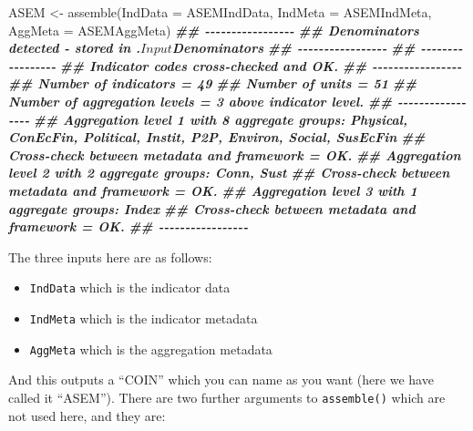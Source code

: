 \documentclass[
]{book}
\newenvironment{Shaded}{\begin{snugshade}}{\end{snugshade}}
\newcommand{\AttributeTok}[1]{\textcolor[rgb]{0.77,0.63,0.00}{#1}}
\newcommand{\DocumentationTok}[1]{\textcolor[rgb]{0.56,0.35,0.01}{\textbf{\textit{#1}}}}
\newcommand{\FunctionTok}[1]{\textcolor[rgb]{0.00,0.00,0.00}{#1}}
\newcommand{\NormalTok}[1]{#1}
\newcommand{\OtherTok}[1]{\textcolor[rgb]{0.56,0.35,0.01}{#1}}
\providecommand{\tightlist}{%
  \setlength{\itemsep}{0pt}\setlength{\parskip}{0pt}}
\begin{document}
\begin{Shaded}
\begin{Highlighting}[]
\NormalTok{ASEM }\OtherTok{\textless{}{-}} \FunctionTok{assemble}\NormalTok{(}\AttributeTok{IndData =}\NormalTok{ ASEMIndData, }\AttributeTok{IndMeta =}\NormalTok{ ASEMIndMeta, }\AttributeTok{AggMeta =}\NormalTok{ ASEMAggMeta)}
\DocumentationTok{\#\# {-}{-}{-}{-}{-}{-}{-}{-}{-}{-}{-}{-}{-}{-}{-}{-}{-}}
\DocumentationTok{\#\# Denominators detected {-} stored in .$Input$Denominators}
\DocumentationTok{\#\# {-}{-}{-}{-}{-}{-}{-}{-}{-}{-}{-}{-}{-}{-}{-}{-}{-}}
\DocumentationTok{\#\# {-}{-}{-}{-}{-}{-}{-}{-}{-}{-}{-}{-}{-}{-}{-}{-}{-}}
\DocumentationTok{\#\# Indicator codes cross{-}checked and OK.}
\DocumentationTok{\#\# {-}{-}{-}{-}{-}{-}{-}{-}{-}{-}{-}{-}{-}{-}{-}{-}{-}}
\DocumentationTok{\#\# Number of indicators = 49}
\DocumentationTok{\#\# Number of units = 51}
\DocumentationTok{\#\# Number of aggregation levels = 3 above indicator level.}
\DocumentationTok{\#\# {-}{-}{-}{-}{-}{-}{-}{-}{-}{-}{-}{-}{-}{-}{-}{-}{-}}
\DocumentationTok{\#\# Aggregation level 1 with 8 aggregate groups: Physical, ConEcFin, Political, Instit, P2P, Environ, Social, SusEcFin}
\DocumentationTok{\#\# Cross{-}check between metadata and framework = OK.}
\DocumentationTok{\#\# Aggregation level 2 with 2 aggregate groups: Conn, Sust}
\DocumentationTok{\#\# Cross{-}check between metadata and framework = OK.}
\DocumentationTok{\#\# Aggregation level 3 with 1 aggregate groups: Index}
\DocumentationTok{\#\# Cross{-}check between metadata and framework = OK.}
\DocumentationTok{\#\# {-}{-}{-}{-}{-}{-}{-}{-}{-}{-}{-}{-}{-}{-}{-}{-}{-}}
\end{Highlighting}
\end{Shaded}

The three inputs here are as follows:

\begin{itemize}
\tightlist
\item
  \texttt{IndData} which is the indicator data
\item
  \texttt{IndMeta} which is the indicator metadata
\item
  \texttt{AggMeta} which is the aggregation metadata
\end{itemize}

And this outputs a ``COIN'' which you can name as you want (here we have called it ``ASEM''). There are two further arguments to \texttt{assemble()} which are not used here, and they are:
\end{document}
